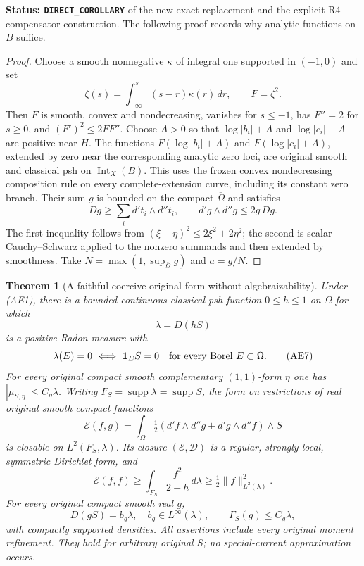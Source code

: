 \documentclass[11pt,a4paper]{article}
\numberwithin{equation}{section}
\newtheorem{theorem}{Theorem}[section]
\theoremstyle{definition}
\theoremstyle{remark}
\begin{document}
\noindent\textbf{Status: \texttt{DIRECT\_COROLLARY}} of the
new exact replacement and the explicit R4 compensator construction.
The following proof records why analytic functions on $B$ suffice.

\begin{proof}
Choose a smooth nonnegative $\kappa$ of integral one supported in
$(-1,0)$ and set
\[
 \zeta(s)=\int_{-\infty}^{s}(s-r)\kappa(r)\,dr,\qquad F=\zeta^2.
\]
Then $F$ is smooth, convex and nondecreasing, vanishes for $s\leq-1$,
has $F''=2$ for $s\geq0$, and $(F')^2\leq2FF''$.
Choose $A>0$ so that $\log|b_i|+A$ and $\log|c_i|+A$
are positive near $H$.  The functions
$F(\log|b_i|+A)$ and $F(\log|c_i|+A)$, extended by zero
near the corresponding analytic zero loci, are original smooth
and classical psh on $\operatorname{Int}_X(B)$.
This uses the frozen convex nondecreasing composition rule on
every complete-extension curve, including its constant zero branch.
Their sum $g$ is bounded on the compact $\overline\Omega$ and satisfies
\[
 Dg\geq\sum_i d't_i\wedge d''t_i,\qquad
 d'g\wedge d''g\leq2g\,Dg.
\]
The first inequality follows from $(\xi-\eta)^2\leq
2\xi^2+2\eta^2$; the second is scalar Cauchy--Schwarz applied
to the nonzero summands and then extended by smoothness.
Take $N=\max(1,\sup_{\overline\Omega}g)$ and $a=g/N$.
\end{proof}

\begin{theorem}[A faithful coercive original form without algebraizability]
\label{thm:r11-general-affinoid-faithful-form}
Under (AE1), there is a bounded continuous classical psh function
$0\leq h\leq1$ on $\Omega$ for which
\[
                      \lambda=D(hS)
 \tag{AE6}
\]
is a positive Radon measure with
\[
 \lambda(E)=0\ \Longleftrightarrow\ {\bf1}_E S=0
 \quad\hbox{for every Borel }E\subset\Omega.
 \tag{AE7}
\]
For every original compact smooth complementary $(1,1)$-form
$\eta$ one has $|\mu_{S,\eta}|\leq C_\eta\lambda$.
Writing $F_S=\operatorname{supp}\lambda=\operatorname{supp}S$, the
form on restrictions of real original smooth compact functions
\[
 \mathcal E(f,g)=\int_\Omega
       \tfrac12(d'f\wedge d''g+d'g\wedge d''f)\wedge S
 \tag{AE8}
\]
is closable on $L^2(F_S,\lambda)$.  Its closure
$(\mathcal E,\mathscr D)$ is a regular, strongly local,
symmetric Dirichlet form, and
\[
 \mathcal E(f,f)\geq\int_{F_S}\frac{f^2}{2-h}\,d\lambda
                         \geq\tfrac12\|f\|_{L^2(\lambda)}^2 .
 \tag{AE9}
\]
For every original compact smooth real $g$,
\[
         D(gS)=b_g\lambda,\quad b_g\in L^\infty(\lambda),
 \qquad \Gamma_S(g)\leq C_g\lambda ,
 \tag{AE10}
\]
with compactly supported densities.  All assertions include every
original moment refinement.  They hold for arbitrary original $S$;
no special-current approximation occurs.
\end{theorem}
\end{document}

